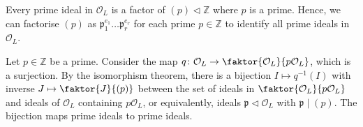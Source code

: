 \begin{remark}
    Every prime ideal in \( \mathcal O_L \) is a factor of \( (p) \triangleleft \mathbb Z \) where \( p \) is a prime.
    Hence, we can factorise \( (p) \) as \( \mathfrak p_1^{e_1} \dots \mathfrak p_r^{e_r} \) for each prime \( p \in \mathbb Z \) to identify all prime ideals in \( \mathcal O_L \).
\end{remark}
Let \( p \in \mathbb Z \) be a prime.
Consider the map \( q \colon \mathcal O_L \to \faktor{\mathcal O_L}{p\mathcal O_L} \), which is a surjection.
By the isomorphism theorem, there is a bijection \( I \mapsto q^{-1}(I) \) with inverse \( J \mapsto \faktor{J}{(p)} \) between the set of ideals in \( \faktor{\mathcal O_L}{p\mathcal O_L} \) and ideals of \( \mathcal O_L \) containing \( p\mathcal O_L \), or equivalently, ideals \( \mathfrak p \triangleleft \mathcal O_L \) with \( \mathfrak p \mid (p) \).
The bijection maps prime ideals to prime ideals.

